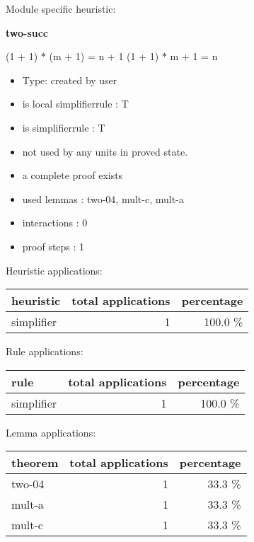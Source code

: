 \documentclass[a4paper]{article}
\begin{document}
Module specific heuristic:

\pagebreak

{\LARGE\bf two-succ}\label{lemma-two-succ}

\medskip

 \Fol (1 + 1) $*$ (m + 1) = n + 1 \Equiv (1 + 1) $*$ m + 1 = n

\begin{itemize}

\item Type: created by user

\item is local simplifierrule : T
\item is simplifierrule : T
\item not used by any units in proved state.
\item       a complete proof exists
\item       used lemmas  : two-04, mult-c, mult-a
\item       interactions : 0
\item       proof steps  : 1
\end{itemize}

\medskip


Heuristic applications:

\begin{supertabular}{l|r|r}
heuristic	& total applications & percentage \\ \hline
simplifier & 1 & 100.0 \% \\

\end{supertabular}

Rule applications:

\begin{supertabular}{l|r|r}
rule	        & total applications & percentage \\ \hline
simplifier & 1 & 100.0 \% \\

\end{supertabular}

Lemma applications:

\begin{supertabular}{l|r|r}
theorem	        & total applications & percentage \\ \hline
two-04 & 1 & 33.3 \% \\
mult-a & 1 & 33.3 \% \\
mult-c & 1 & 33.3 \% \\

\end{supertabular}
\end{document}
